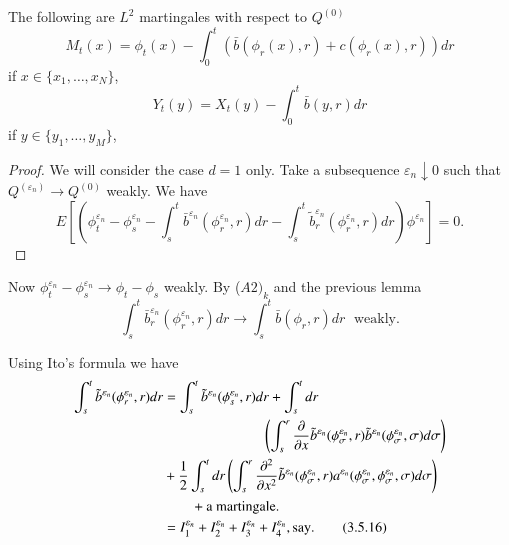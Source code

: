 \setcounter{Lemma}{3}
\begin{Lemma}\label{c3:lem3.5.4}%
  The following are $L^2$ martingales with respect to $Q^{(0)}$
\begin{equation*}
  M_t(x) = \phi_t(x) - \int^t_0 (\bar{b} (\phi_r(x),r) +
  c(\phi_r(x),r)) dr \tag{3.5.12}\label{c3:eq3.5.12} 
\end{equation*}
if $x \in \{x_1, \ldots,  x_N \}$,
\begin{equation*}
  Y_t(y) = X_t(y) - \int^t_0 \bar{b}
(y,r)dr \tag{3.5.13}\label{c3:eq3.5.13}
\end{equation*}
if $y \in \{y_1, \ldots,  y_M \}$,
\end{Lemma}

\begin{proof}
  We will consider the case $d=1$ only. Take a subsequence
  $\varepsilon_n \downarrow 0$ such that $Q^{(\varepsilon_n)}
  \rightarrow Q^{(0)}$ weakly. We have 
  \begin{equation*}
    E\left[\left( \phi^{\varepsilon_n}_t -\phi^{\varepsilon_n}_s - \int^t_s
      \bar{b}^{\varepsilon_n} (\phi^{\varepsilon_n}_r, r)dr - \int^t_s
      \tilde{b}^{\varepsilon_n}_r (\phi^{\varepsilon_n}_r, r)dr\right)
      \phi^{\varepsilon_n}\right] = 0. \tag{3.5.14}\label{c3:eq3.5.14} 
  \end{equation*}
\end{proof}

Now $\phi^{\varepsilon_n}_t - \phi^{\varepsilon_n}_s \rightarrow
\phi_t - \phi_s$ weakly. By ($A2)_k$ and the previous lemma 
\begin{equation*}
 \int^t_s \bar{b}^{\varepsilon_n}_r (\phi^{\varepsilon_n}_r, r)dr
 \rightarrow \int^t_s \bar{b}(\phi_r,  r)dr \; 
 \text{ weakly}. \tag{3.5.15}\label{c3:eq3.5.15}
\end{equation*}

Using Ito's formula we have
\begin{align*}
  \int^t_s \tilde{b}^{\varepsilon_n} (\phi^{\varepsilon_n}_r, r)dr & =
  \int^t_s \tilde{b}^{\varepsilon_n} (\phi^{\varepsilon_n}_s, r)dr +
  \int^t_s  dr\\ 
  & \hspace{2.5cm}\left(\int^r_s  \frac{\partial}{\partial x}
  \tilde{b}^{\varepsilon_n} (\phi^{\varepsilon_n}_\sigma, r)
  \tilde{b}^{\varepsilon_n} (\phi^{\varepsilon_n}_\sigma, \sigma)d
  \sigma\right) \\ 
  & + \frac{1}{2} \int^t_s dr \left(\int^r_s \frac{\partial^2}{\partial
    x^2} \tilde{b}^{\varepsilon_n} (\phi^{\varepsilon_n}_\sigma, r)
  a^{\varepsilon_n} (\phi^{\varepsilon_n}_\sigma,
  \phi^{\varepsilon_n}_\sigma,  \sigma ) d \sigma \right) \\ 
  & \qquad +   \text{a martingale}. \\
  & = I^{\varepsilon_n}_1 + I^{\varepsilon_n}_2 + I^{\varepsilon_n}_3
  + I^{\varepsilon_n}_4,  \text{say}. \tag{3.5.16}\label{c3:eq3.5.16} 
\end{align*}

